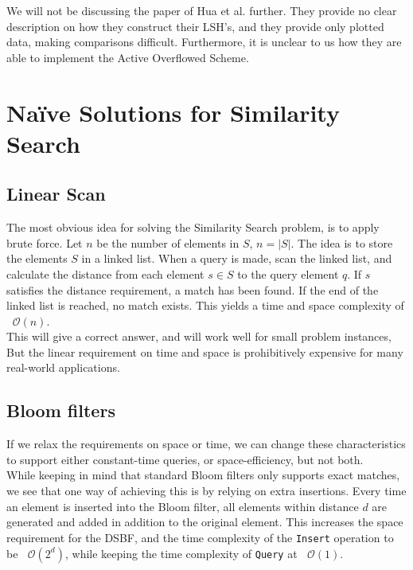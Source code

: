 \documentclass[a4paper,11pt]{article}
\newcommand{\BigO}[1]{\ensuremath{\mathop{}\mathopen{}\mathcal{O}\mathopen{}\left(#1\right)}}
\begin{document}
We will not be discussing the paper of Hua et al.\cite{paper:hua} further. They provide no clear description on how they construct their LSH's, and they provide only plotted data, making comparisons difficult. Furthermore, it is unclear to us how they are able to implement the Active Overflowed Scheme.

\section{Naïve Solutions for Similarity Search} \label{naive_approaches}

\subsection{Linear Scan}
The most obvious idea for solving the Similarity Search problem, is to apply brute force.
Let $n$ be the number of elements in $S$, $n = |S|$.
The idea is to store the elements $S$ in a linked list. When a query is made, scan the linked list, and calculate the distance from each element $s \in S$ to the query element $q$. If $s$ satisfies the distance requirement, a match has been found. If the end of the linked list is reached, no match exists.
This yields a time and space complexity of \BigO{n}.\\

This will give a correct answer, and will work well for small problem instances, But the linear requirement on time and space is prohibitively expensive for many real-world applications.

\subsection{Bloom filters} If we relax the requirements on space or time, we can change these characteristics to support either constant-time queries, or space-efficiency, but not both.\\

While keeping in mind that standard Bloom filters only supports exact matches, we see that one way of achieving this is by relying on extra insertions. Every time an element is inserted into the Bloom filter, all elements within distance $d$ are generated and added in addition to the original element. This increases the space requirement for the DSBF, and the time complexity of the \texttt{Insert} operation to be \BigO{2^d}, while keeping the time complexity of \texttt{Query} at \BigO{1}.\\
\end{document}

